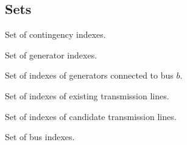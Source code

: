 \subsection{Sets}
\begin{description}

\item[${\cal C}$] Set of contingency indexes.

\item[${I}$] Set of generator indexes.

\item[${I}_{b}$] Set of indexes of generators connected to bus $b$.

\item[${\cal L}$] Set of indexes of existing transmission lines.

\item[${\cal L}^{C}$] Set of indexes of candidate transmission lines.

\item[${N}$] Set of bus indexes.

\end{description}